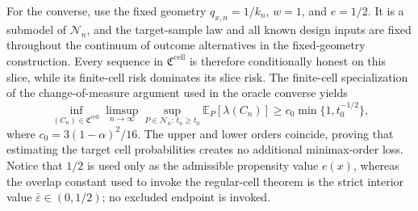 For the converse, use the fixed geometry \(q_{x,n}=1/k_n\), \(w=1\), and \(e=1/2\).  It is a submodel of \(\mathcal N_n\), and the target-sample law and all known design inputs are fixed throughout the continuum of outcome alternatives in the fixed-geometry construction.  Every sequence in \(\mathfrak C^{\mathrm{cell}}\) is therefore conditionally honest on this slice, while its finite-cell risk dominates its slice risk.  The finite-cell specialization of the change-of-measure argument used in the oracle converse yields
\[
\inf_{(C_n)\in\mathfrak C^{\mathrm{cell}}}
\limsup_{n\to\infty}
\sup_{P\in\mathcal N_n:\,t_n\ge t_0}
\mathbb E_P[\lambda(C_n)]
\ge c_0\min\{1,t_0^{-1/2}\},
\]
where \(c_0=3(1-\alpha)^2/16\).  The upper and lower orders coincide, proving that estimating the target cell probabilities creates no additional minimax-order loss.  Notice that \(1/2\) is used only as the admissible propensity value \(e(x)\), whereas the overlap constant used to invoke the regular-cell theorem is the strict interior value \(\bar\varepsilon\in(0,1/2)\); no excluded endpoint is invoked.
